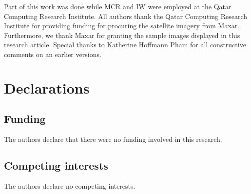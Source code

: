 \documentclass[sn-basic]{sn-jnl}%
\begin{document}
{\clearpage
\backmatter




Part of this work was done while MCR and IW were employed at the Qatar Computing Research Institute. All authors thank the Qatar Computing Research Institute for providing funding for procuring the satellite imagery from Maxar. Furthermore, we thank Maxar for 
granting the sample images displayed in this research article. Special thanks to Katherine Hoffmann Pham for all constructive comments on an earlier versions. 




\section*{Declarations}



\subsection*{Funding}
The authors declare that there were no funding involved in this research.

\subsection*{Competing interests}
The authors declare no competing interests.

}
\end{document}
